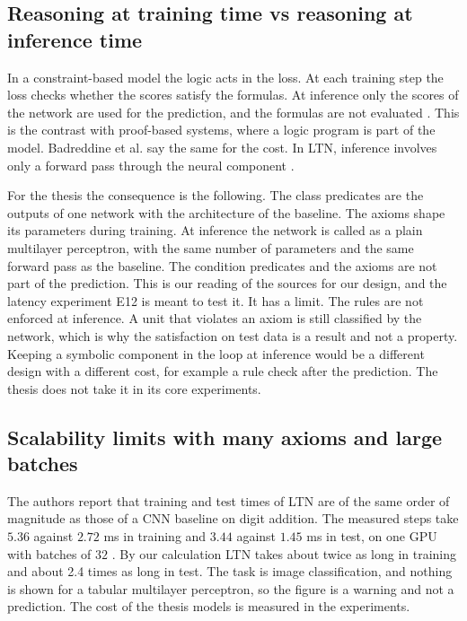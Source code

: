 \subsection{Reasoning at training time vs reasoning at inference time}
\label{sec:inference-vs-training}

In a constraint-based model the logic acts in the loss. At each training step
the loss checks whether the scores satisfy the formulas. At inference only the
scores of the network are used for the prediction, and the formulas are not
evaluated \citep{marra2024statistical}. This is the contrast with proof-based
systems, where a logic program is part of the model. Badreddine et al. say the
same for the cost. In LTN, inference involves only a forward pass through the
neural component \citep{badreddine2022ltn}.

For the thesis the consequence is the following. The class predicates are the
outputs of one network with the architecture of the baseline. The axioms shape
its parameters during training. At inference the network is called as a plain
multilayer perceptron, with the same number of parameters and the same forward
pass as the baseline. The condition predicates and the axioms are not part of
the prediction. This is our reading of the sources for our design, and the
latency experiment E12 is meant to test it.
It has a limit. The rules are not enforced at inference. A unit that violates
an axiom is still classified by the network, which is why the satisfaction on
test data is a result and not a property. Keeping a symbolic component in the
loop at inference would be a different design with a different cost, for
example a rule check after the prediction. The thesis does not take it in its
core experiments.

\subsection{Scalability limits with many axioms and large batches}
\label{sec:scalability-limits}

The authors report that training and test times of LTN are of the same order
of magnitude as those of a CNN baseline on digit addition. The measured steps
take $5.36$ against $2.72$ ms in training and $3.44$ against $1.45$ ms in
test, on one GPU with batches of $32$ \citep{badreddine2022ltn}. By our
calculation LTN takes about twice as long in training and about 2.4 times as
long in test. The task is image
classification, and nothing is shown for a tabular multilayer perceptron, so
the figure is a warning and not a prediction. The cost of the thesis models is
measured in the experiments.

